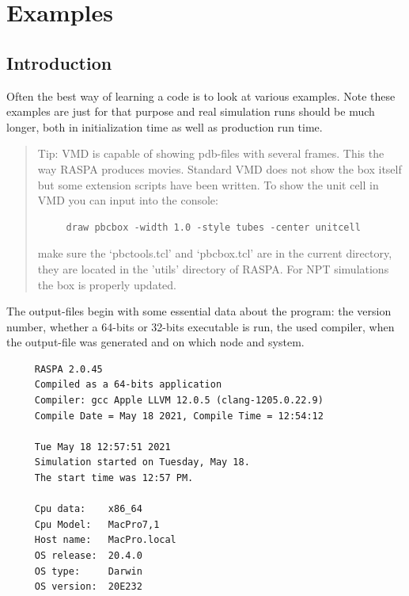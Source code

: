 \chapter{Examples\label{Examples: chapter}}

\section{Introduction}

Often the best way of learning a code is to look at various examples. Note these examples are just for that purpose
and real simulation runs should be much longer, both in initialization time as well as production run time.

\begin{quote}
Tip: VMD is capable of showing pdb-files with several frames. This the way RASPA produces movies. Standard VMD does
not show the box itself but some extension scripts have been written. To show the unit cell in VMD you can
input into the console:
\begin{verbatim}
     draw pbcbox -width 1.0 -style tubes -center unitcell
\end{verbatim}
make sure the `pbctools.tcl' and `pbcbox.tcl' are in the current directory, they are located in the 'utils' directory of RASPA.
For NPT simulations the box is properly updated.
\end{quote}

The output-files begin with some essential data about the program: the version number, whether a 64-bits or 32-bits executable is run,
the used compiler, when the output-file was generated and on which node and system.
\begin{verbatim}
     RASPA 2.0.45
     Compiled as a 64-bits application
     Compiler: gcc Apple LLVM 12.0.5 (clang-1205.0.22.9)
     Compile Date = May 18 2021, Compile Time = 12:54:12

     Tue May 18 12:57:51 2021
     Simulation started on Tuesday, May 18.
     The start time was 12:57 PM.

     Cpu data:    x86_64
     Cpu Model:   MacPro7,1
     Host name:   MacPro.local
     OS release:  20.4.0
     OS type:     Darwin
     OS version:  20E232
\end{verbatim}

